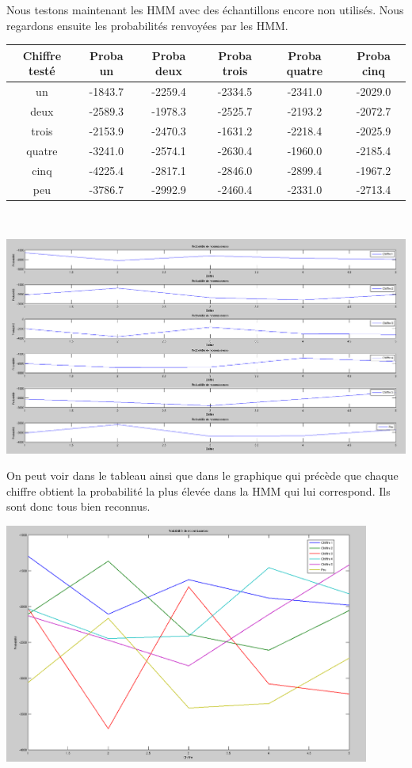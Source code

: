 Nous testons maintenant les HMM avec des échantillons encore non utilisés. Nous regardons ensuite les probabilités renvoyées par les HMM.
\\

\begin{tabular}{|c|c|c|c|c|c|}
\hline 
Chiffre testé & Proba un & Proba deux & Proba trois & Proba quatre & Proba cinq \\ 
\hline 
un & -1843.7 & -2259.4 & -2334.5 & -2341.0 & -2029.0 \\ 
\hline 
deux & -2589.3 & -1978.3 & -2525.7 & -2193.2 & -2072.7 \\ 
\hline 
trois & -2153.9 & -2470.3 & -1631.2 & -2218.4 & -2025.9 \\ 
\hline 
quatre & -3241.0 & -2574.1 & -2630.4 & -1960.0 & -2185.4 \\ 
\hline 
cinq & -4225.4 & -2817.1 & -2846.0 & -2899.4 & -1967.2 \\ 
\hline 
peu & -3786.7 & -2992.9 & -2460.4 & -2331.0 & -2713.4 \\ 
\hline 
\end{tabular} 
\\

\begin{center}
\includegraphics[width=17cm]{Ressources/Graphiques/ProbaReconnSepare.png} 
\end{center}

On peut voir dans le tableau ainsi que dans le graphique qui précède que chaque chiffre obtient la probabilité la plus élevée dans la HMM qui lui correspond. Ils sont donc tous bien reconnus.

\begin{center}
\includegraphics[width=12cm]{Ressources/Graphiques/ProbaReconnTout.png} 
\end{center}

